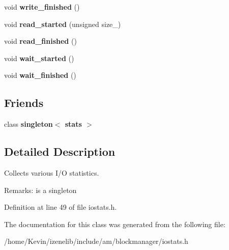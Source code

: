\begin{CompactItemize}
\item 
\hypertarget{group__iolayer_g5965fa84c7858b4ca62498106ffdb09b}{
void \textbf{write\_\-finished} ()}
\label{group__iolayer_g5965fa84c7858b4ca62498106ffdb09b}

\item 
\hypertarget{group__iolayer_gafaf899b318946ab046da27c93ef49e4}{
void \textbf{read\_\-started} (unsigned size\_\-)}
\label{group__iolayer_gafaf899b318946ab046da27c93ef49e4}

\item 
\hypertarget{group__iolayer_g0c21c9569c80c2708b9930971502ed4f}{
void \textbf{read\_\-finished} ()}
\label{group__iolayer_g0c21c9569c80c2708b9930971502ed4f}

\item 
\hypertarget{group__iolayer_g6fd33395eeac6ec8929b930e4fef328a}{
void \textbf{wait\_\-started} ()}
\label{group__iolayer_g6fd33395eeac6ec8929b930e4fef328a}

\item 
\hypertarget{group__iolayer_g98c7d5499874405c7688519c8d328f93}{
void \textbf{wait\_\-finished} ()}
\label{group__iolayer_g98c7d5499874405c7688519c8d328f93}

\end{CompactItemize}
\subsection*{Friends}
\begin{CompactItemize}
\item 
\hypertarget{classstats_22b8478672f97fdf6efe2991e6d3a906}{
class \textbf{singleton$<$ stats $>$}}
\label{classstats_22b8478672f97fdf6efe2991e6d3a906}

\end{CompactItemize}


\subsection{Detailed Description}
Collects various I/O statistics. 

\begin{Desc}
\item[Remarks:]is a singleton \end{Desc}


Definition at line 49 of file iostats.h.

The documentation for this class was generated from the following file:\begin{CompactItemize}
\item 
/home/Kevin/izenelib/include/am/blockmanager/iostats.h\end{CompactItemize}
